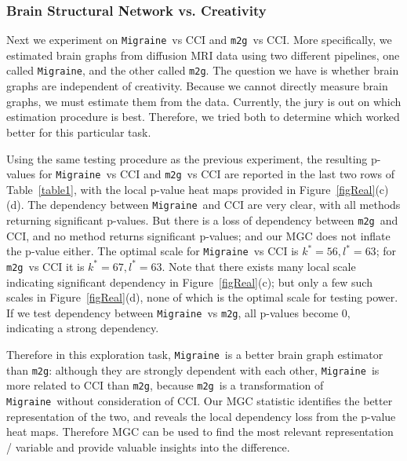 \documentclass[11pt]{article}
\providecommand{\sct}[1]{{\sc \texttt{#1}}}
\newcommand{\Migraine}{\sct{Migraine}}
\newcommand{\mtg}{\sct{m2g}}
\newcommand{\jv}[1]{{\color{red}{#1}}}
\newcommand{\cs}[1]{{\color{blue}{#1}}}
\begin{document}
\subsubsection{Brain Structural Network vs. Creativity}

Next we experiment on \Migraine~vs CCI and \mtg~vs CCI. More specifically, we estimated brain graphs from diffusion MRI data using two different pipelines, one called \Migraine, and the other called \mtg.  The question we have is whether brain graphs are independent of creativity.  Because we cannot directly measure brain graphs, we must estimate them from the data.  Currently, the jury is out on which estimation procedure is best.  Therefore, we tried both to determine which worked better for this particular task.

Using the same testing procedure as the previous experiment, the resulting p-values for \Migraine~vs CCI and \mtg~vs CCI are reported in the last two rows of Table~\ref{table1}, with the local p-value heat maps provided in Figure~\ref{figReal}(c)(d). The dependency between \Migraine~and CCI are very clear, with all methods returning significant p-values. But there is a loss of dependency between \mtg~and CCI, and no method returns significant p-values; and our MGC does not inflate the p-value either. The optimal scale for \Migraine~vs CCI is $k^{*}=56,l^{*}=63$; for \mtg~vs CCI it is $k^{*}=67,l^{*}=63$. 
Note that there exists many local scale indicating significant dependency in Figure~\ref{figReal}(c); but only a few such scales in Figure~\ref{figReal}(d), none of which is the optimal scale for testing power.
\jv{i don't understand this comment.  optimal scale is the one with the smallest p-value? or estimated higher power? what is the smaller p-value?}
\cs{optimal scale is the one with the highest power. The optimal scale that has the highest power means it is the most reliable scale for testing: more likely to reject ind hypothesis if and only if dependent. For example, a scale that has a smaller p-value may also has a low power, which means the p-value is not so reliable.}
\jv{but how can none be the optimal scale? oh, you mean that for the scales with p less than .05, the power is not as large as other powers? if you mean something like that, please clarify.}
\cs{yes and clarified}
If we test dependency between \Migraine~vs \mtg, all p-values become $0$, indicating a strong dependency. 

Therefore in this exploration task, \Migraine~is a better brain graph estimator than \mtg: although they are strongly dependent with each other, \Migraine~is more related to CCI than \mtg, because \mtg~is a transformation of \Migraine~without consideration of CCI. Our MGC statistic identifies the better representation of the two, and reveals the local dependency loss from the p-value heat maps. Therefore MGC can be used to find the most relevant representation / variable and provide valuable insights into the difference.
\end{document}
